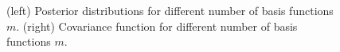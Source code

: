 \documentclass[]{interact}
\theoremstyle{plain}%
\theoremstyle{definition}
\theoremstyle{remark}
\begin{document}
\begin{figure}
\centering
{}
\caption{(left) Posterior distributions for different number of basis functions $m$. (right) Covariance function for different number of basis functions $m$.}
  \label{fig1_Post_J}
\end{figure}
\end{document}
